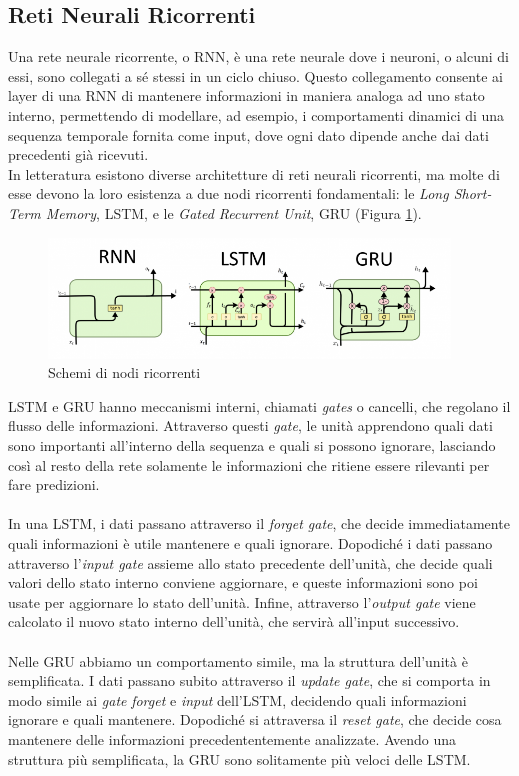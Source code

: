 \subsection{Reti Neurali Ricorrenti}
Una rete neurale ricorrente, o RNN, è una rete neurale dove i neuroni, o alcuni di essi, sono collegati a sé stessi in un ciclo chiuso. Questo collegamento consente ai layer di una RNN di mantenere informazioni in maniera analoga ad uno stato interno, permettendo di modellare, ad esempio, i comportamenti dinamici di una sequenza temporale fornita come input, dove ogni dato dipende anche dai dati precedenti già ricevuti.\\
In letteratura esistono diverse architetture di reti neurali ricorrenti, ma molte di esse devono la loro esistenza a due nodi ricorrenti fondamentali: le \textit{Long Short-Term Memory}, LSTM, e le \textit{Gated Recurrent Unit}, GRU (Figura \ref{fig:rnnlstmgru}). 
\begin{figure}[h]
	\begin{center}
		\includegraphics[width=0.95\textwidth]{img/rnnlstmgru.png}
		\caption{Schemi di nodi ricorrenti}
		\label{fig:rnnlstmgru}
	\end{center}
\end{figure}
LSTM e GRU hanno meccanismi interni, chiamati \textit{gates} o cancelli, che regolano il flusso delle informazioni. Attraverso questi \textit{gate}, le unità apprendono quali dati sono importanti all'interno della sequenza e quali si possono ignorare, lasciando così al resto della rete solamente le informazioni che ritiene essere rilevanti per fare predizioni.\\\\
In una LSTM, i dati passano attraverso il \textit{forget gate}, che decide immediatamente quali informazioni è utile mantenere e quali ignorare. Dopodiché i dati passano attraverso l'\textit{input gate} assieme allo stato precedente dell'unità, che decide quali valori dello stato interno conviene aggiornare, e queste informazioni sono poi usate per aggiornare lo stato dell'unità. Infine, attraverso l'\textit{output gate} viene calcolato il nuovo stato interno dell'unità, che servirà all'input successivo.\\\\
Nelle GRU abbiamo un comportamento simile, ma la struttura dell'unità è semplificata. I dati passano subito attraverso il \textit{update gate}, che si comporta in modo simile ai \textit{gate} \textit{forget} e \textit{input} dell'LSTM, decidendo quali informazioni ignorare e quali mantenere. Dopodiché si attraversa il \textit{reset gate}, che decide cosa mantenere delle informazioni precedententemente analizzate. Avendo una struttura più semplificata, la GRU sono solitamente più veloci delle LSTM.
\pagebreak
